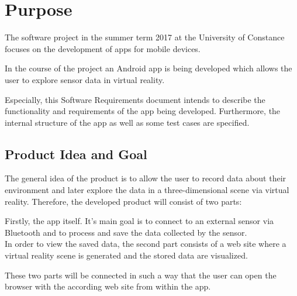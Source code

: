\section{Purpose}

The software project in the summer term 2017 at the University of Constance focuses on the development of apps for mobile devices.

In the course of the project an Android app is being developed which allows the user to explore sensor data in virtual reality.

Especially, this Software Requirements document intends to describe the functionality and requirements of the app being developed. Furthermore, the internal structure of the app as well as some test cases are specified.

\subsection{Product Idea and Goal}

The general idea of the product is to allow the user to record data about their environment and later explore the data in a three-dimensional scene via virtual reality. Therefore, the developed product will consist of two parts:

Firstly, the app itself. It's main goal is to connect to an external sensor via Bluetooth and to process and save the data collected by the sensor. \\
In order to view the saved data, the second part consists of a web site where a virtual reality scene is generated and the stored data are visualized. 

These two parts will be connected in such a way that the user can open the browser with the according web site from within the app.





